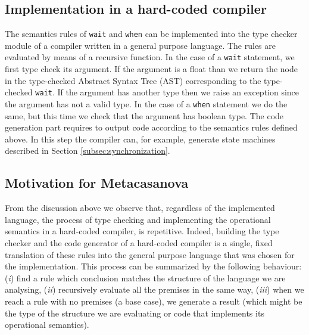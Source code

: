 \subsection{Implementation in a hard-coded compiler}
The semantics rules of \texttt{wait} and \texttt{when} can be implemented into the type checker module of a compiler written in a general purpose language. The rules are evaluated by means of a recursive function. In the case of a \texttt{wait} statement, we first type check its argument. If the argument is a float than we return the node in the type-checked Abstract Syntax Tree (AST) corresponding to the type-checked \texttt{wait}. If the argument has another type then we raise an exception since the argument has not a valid type. In the case of a \texttt{when} statement we do the same, but this time we check that the argument has boolean type.
The code generation part requires to output code according to the semantics rules defined above. In this step the compiler can, for example, generate state machines described in Section \ref{subsec:synchronization}.

\subsection{Motivation for Metacasanova}

From the discussion above we observe that, regardless of the implemented language, the process of type checking and implementing the operational semantics in a hard-coded compiler, is repetitive. Indeed, building the type checker and the code generator of a hard-coded compiler is a single, fixed translation of these rules into the general purpose language that was chosen for the implementation. This process can be summarized by the following behaviour: (\textit{i}) find a rule which conclusion matches the structure of the language we are analysing, (\textit{ii}) recursively evaluate all the premises in the same way, (\textit{iii}) when we reach a rule with no premises (a base case), we generate a result (which might be the type of the structure we are evaluating or code that implements its operational semantics).


